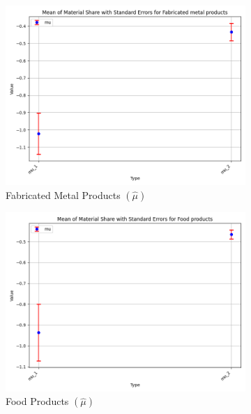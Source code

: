 \documentclass{article}
\begin{document}
\begin{figure}[ht!]
    \begin{subfigure}[t]{0.32\textwidth}
        \centering
        \includegraphics[width=\textwidth]{figure/empirical_stat_normal_mu_with_error_bars_Fabricated metal products.png}
        \caption{Fabricated Metal Products $(\hat\mu)$}
    \end{subfigure}
    \begin{subfigure}[t]{0.32\textwidth}
        \centering
        \includegraphics[width=\textwidth]{figure/empirical_stat_normal_mu_with_error_bars_Food products.png}
        \caption{Food Products $(\hat\mu)$}
    \end{subfigure}
    \begin{subfigure}[t]{0.32\textwidth}
        \centering

\end{subfigure}
\end{figure}
\end{document}
